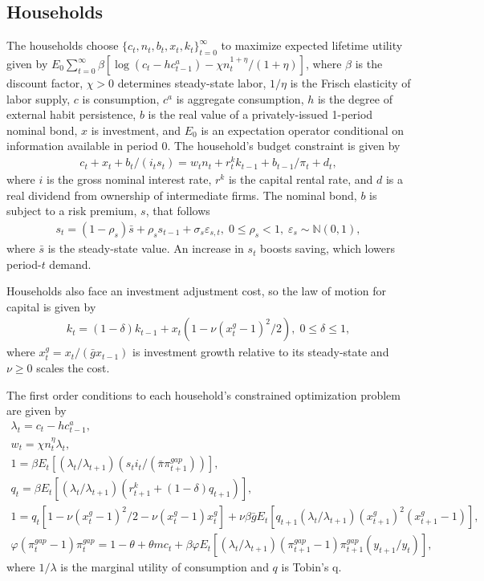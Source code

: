 \documentclass[12pt, final]{article}
\begin{document}
\subsection{Households} The households choose $\{c_t, n_t, b_t, x_t, k_t\}_{t=0}^\infty$ to maximize expected lifetime utility given by $E_0\sum_{t=0}^\infty\beta[\log(c_t-hc^a_{t-1}) - \chi n_t^{1+\eta}/(1+\eta)]$, where $\beta$ is the discount factor, $\chi > 0$ determines steady-state labor, $1/\eta$ is the Frisch elasticity of labor supply, $c$ is consumption, $c^a$ is aggregate consumption, $h$ is the degree of external habit persistence, $b$ is the real value of a privately-issued 1-period nominal bond, $x$ is investment, and $E_0$ is an expectation operator conditional on information available in period 0. The household's budget constraint is given by
\begin{gather*}
    c_t+x_t+b_t/(i_ts_t)=w_tn_t+r_t^kk_{t-1}+b_{t-1}/\pi_t+d_t,
  \end{gather*}
where $i$ is the gross nominal interest rate, $r^k$ is the capital rental rate, and $d$ is a real dividend from ownership of intermediate firms. The nominal bond, $b$ is subject to a risk premium, $s$, that follows
\begin{gather}
  \label{eq:6}
  s_t = (1-\rho_s)\bar{s} + \rho_ss_{t-1} + \sigma_s\varepsilon_{s,t},\; 0 \leq \rho_s < 1,\; \varepsilon_s \sim \mathds{N}(0,1),
\end{gather}
where $\bar{s}$ is the steady-state value. An increase in $s_t$ boosts saving, which lowers period-$t$ demand.

Households also face an investment adjustment cost, so the law of motion for capital is given by
\begin{gather}
  k_t = (1-\delta)k_{t-1} + x_t(1-\nu(x^g_t - 1)^2/2),\; 0 \leq \delta \leq 1,
  \end{gather}
where $x_t^g = x_t/(\bar{g}x_{t-1})$ is investment growth relative to its steady-state and $\nu \geq 0$ scales the cost.

The first order conditions to each household's constrained optimization problem are given by
\begin{gather}
  \lambda_t = c_t - hc^a_{t-1}, \\
  w_t = \chi n_t^\eta \lambda_t,\\
  1 =  \beta E_t[(\lambda_t/\lambda_{t+1})(s_ti_t/(\bar{\pi}\pi_{t+1}^{gap}))],\\
  q_t = \beta E_t[(\lambda_t/\lambda_{t+1})(r^k_{t+1}+(1-\delta)q_{t+1})],\\
  1 = q_t[1-\nu(x^g_t-1)^2/2 - \nu(x_t^g-1)x_t^g] + \nu\beta\bar{g}E_t[q_{t+1}(\lambda_t/\lambda_{t+1})(x^g_{t+1})^2(x^g_{t+1}-1)],\\
  \varphi(\pi_t^{gap}-1)\pi_t^{gap} = 1-\theta + \theta mc_t + \beta\varphi E_t[(\lambda_t/\lambda_{t+1})(\pi_{t+1}^{gap}-1)\pi_{t+1}^{gap}(y_{t+1}/y_t)],
\end{gather}
where $1/\lambda$ is the marginal utility of consumption and $q$ is Tobin's q.\\
\end{document}
